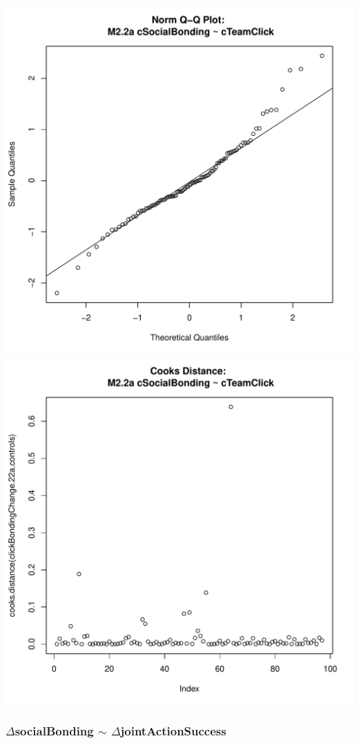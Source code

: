\documentclass[12pt]{report}
\begin{document}
\includegraphics[scale =.4]{../images/MLM22aQQNorm.pdf}
\includegraphics[scale =.4]{../images/MLM22aCooksD.pdf}


\newpage
\subsubsection{$\Delta$socialBonding $\sim$ $\Delta$jointActionSuccess}
\end{document}
